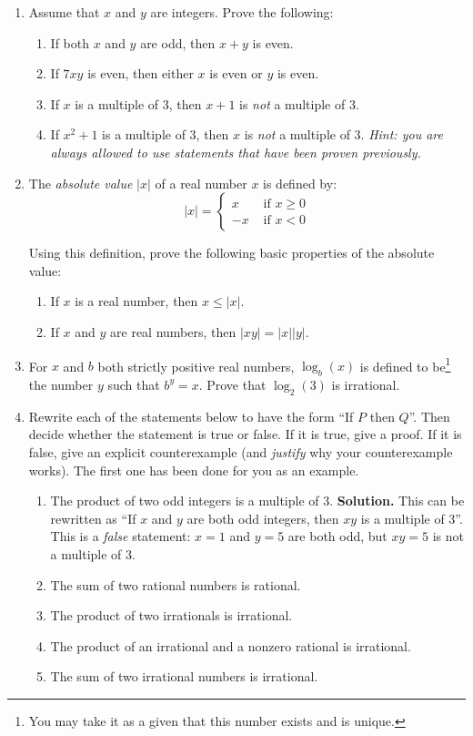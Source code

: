 \documentclass{amsart}
\theoremstyle{definition}
\begin{document}
\begin{enumerate}
\item Assume that $x$ and $y$ are integers. Prove the following:

  \begin{enumerate}
  \item If both $x$ and $y$ are odd, then $x + y$ is even.
  \item If $7xy$ is even, then either $x$ is even or $y$ is even.
  \item If $x$ is a multiple of 3, then $x + 1$ is \emph{not} a multiple of $3$.
  \item If $x^2 + 1$ is a multiple of $3$, then $x$ is \emph{not} a multiple of $3$. \emph{Hint: you are always allowed to use statements that have been proven previously.}
  \end{enumerate}
\item The \emph{absolute value} $|x|$ of a real number $x$ is defined by:
  $$
  |x| = \begin{cases}
    x &\text{ if } x \ge 0 \\
    -x &\text{ if } x < 0
  \end{cases}
  $$

  Using this definition, prove the following basic properties of the absolute value:

  \begin{enumerate}
  \item If $x$ is a real number, then $x \le |x|$.
  \item If $x$ and $y$ are real numbers, then $|xy| = |x||y|$.
  \end{enumerate}
\item For $x$ and $b$ both strictly positive real numbers, $\log_b (x)$ is defined to be\footnote{You may take it as a given that this number exists and is unique.} the number $y$ such that $b^y = x$. Prove that $\log_2 (3)$ is irrational.
\item Rewrite each of the statements below to have the form ``If $P$ then $Q$''. Then decide whether the statement is true or false. If it is true, give a proof. If it is false, give an explicit counterexample (and \emph{justify} why your counterexample works). The first one has been done for you as an example.

  \begin{enumerate}
  \item The product of two odd integers is a multiple of $3$. \textbf{Solution.} This can be rewritten as ``If $x$ and $y$ are both odd integers, then $x y$ is a multiple of $3$''. This is a \emph{false} statement:  $x = 1$ and $y = 5$ are both odd, but $x y = 5$ is not a multiple of $3$.
  \item The sum of two rational numbers is rational.
  \item The product of two irrationals is irrational.
  \item The product of an irrational and a nonzero rational is irrational.
  \item The sum of two irrational numbers is irrational.
  \end{enumerate}
  
\end{enumerate}


\end{document}
